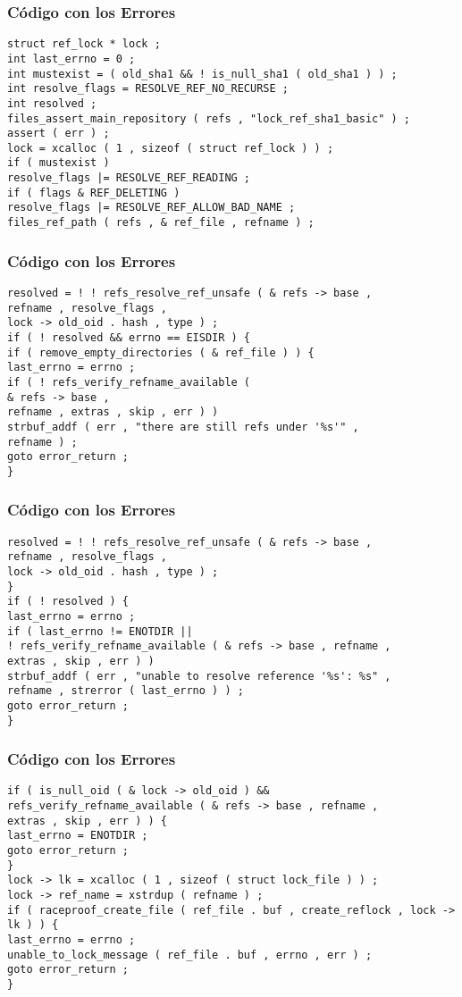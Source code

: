 \documentclass{beamer}
\begin{document}
\begin{frame}[fragile]
\frametitle{C\'odigo con los Errores}
\begin{verbatim}
struct ref_lock * lock ; 
int last_errno = 0 ; 
int mustexist = ( old_sha1 && ! is_null_sha1 ( old_sha1 ) ) ; 
int resolve_flags = RESOLVE_REF_NO_RECURSE ; 
int resolved ; 
files_assert_main_repository ( refs , "lock_ref_sha1_basic" ) ; 
assert ( err ) ; 
lock = xcalloc ( 1 , sizeof ( struct ref_lock ) ) ; 
if ( mustexist ) 
resolve_flags |= RESOLVE_REF_READING ; 
if ( flags & REF_DELETING ) 
resolve_flags |= RESOLVE_REF_ALLOW_BAD_NAME ; 
files_ref_path ( refs , & ref_file , refname ) ; 
\end{verbatim}
\end{frame}
\begin{frame}[fragile]
\frametitle{C\'odigo con los Errores}
\begin{verbatim}
resolved = ! ! refs_resolve_ref_unsafe ( & refs -> base , 
refname , resolve_flags , 
lock -> old_oid . hash , type ) ; 
if ( ! resolved && errno == EISDIR ) { 
if ( remove_empty_directories ( & ref_file ) ) { 
last_errno = errno ; 
if ( ! refs_verify_refname_available ( 
& refs -> base , 
refname , extras , skip , err ) ) 
strbuf_addf ( err , "there are still refs under '%s'" , 
refname ) ; 
goto error_return ; 
} 
\end{verbatim}
\end{frame}
\begin{frame}[fragile]
\frametitle{C\'odigo con los Errores}
\begin{verbatim}
resolved = ! ! refs_resolve_ref_unsafe ( & refs -> base , 
refname , resolve_flags , 
lock -> old_oid . hash , type ) ; 
} 
if ( ! resolved ) { 
last_errno = errno ; 
if ( last_errno != ENOTDIR || 
! refs_verify_refname_available ( & refs -> base , refname , 
extras , skip , err ) ) 
strbuf_addf ( err , "unable to resolve reference '%s': %s" , 
refname , strerror ( last_errno ) ) ; 
goto error_return ; 
} 
\end{verbatim}
\end{frame}
\begin{frame}[fragile]
\frametitle{C\'odigo con los Errores}
\begin{verbatim}
if ( is_null_oid ( & lock -> old_oid ) && 
refs_verify_refname_available ( & refs -> base , refname , 
extras , skip , err ) ) { 
last_errno = ENOTDIR ; 
goto error_return ; 
} 
lock -> lk = xcalloc ( 1 , sizeof ( struct lock_file ) ) ; 
lock -> ref_name = xstrdup ( refname ) ; 
if ( raceproof_create_file ( ref_file . buf , create_reflock , lock -> lk ) ) { 
last_errno = errno ; 
unable_to_lock_message ( ref_file . buf , errno , err ) ; 
goto error_return ; 
} 
\end{verbatim}
\end{frame}
\end{document}

